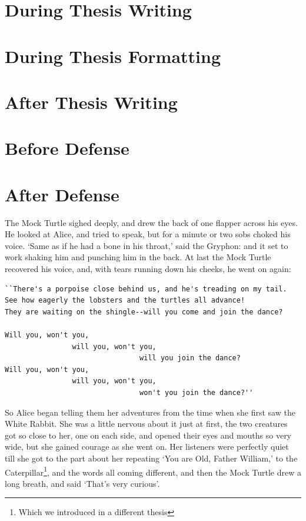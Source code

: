 \documentclass[12pt,chapterheads]{ucsd}
\begin{document}
\section{During Thesis Writing}
\section{During Thesis Formatting}
\section{After Thesis Writing}
\section{Before Defense}
\section{After Defense}

The Mock Turtle sighed deeply, and drew the back of one flapper across his eyes. He looked at Alice, and tried to speak, but for a minute or two sobs choked his voice. `Same as if he had a bone in his throat,' said the Gryphon: and it set to work shaking him and punching him in the back. At last the Mock Turtle recovered his voice, and, with tears running down his cheeks, he went on again:


\begin{verbatim}
``There's a porpoise close behind us, and he's treading on my tail.
See how eagerly the lobsters and the turtles all advance!
They are waiting on the shingle--will you come and join the dance?

Will you, won't you, 
                will you, won't you, 
                                will you join the dance?
Will you, won't you, 
                will you, won't you, 
                                won't you join the dance?''
\end{verbatim}



So Alice began telling them her adventures from the time when she first saw the White Rabbit. She was a little nervous about it just at first, the two creatures got so close to her, one on each side, and opened their eyes and mouths so very wide, but she gained courage as she went on. Her listeners were perfectly quiet till she got to the part about her repeating `You are Old, Father William,' to the Caterpillar\footnote{Which we introduced in a different thesis}, and the words all coming different, and then the Mock Turtle drew a long breath, and said `That's very curious'.
\end{document}
